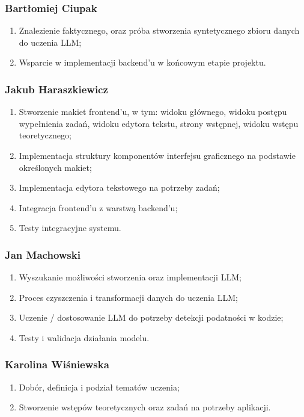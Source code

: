 \documentclass[12pt,a4paper]{article}
\begin{document}
\subsubsection*{Bartłomiej Ciupak}
\begin{enumerate}
    \item Znalezienie faktycznego, oraz próba stworzenia syntetycznego zbioru danych do uczenia LLM;
    \item Wsparcie w implementacji backend'u w końcowym etapie projektu.
\end{enumerate}

\subsubsection*{Jakub Haraszkiewicz}
\begin{enumerate}
    \item Stworzenie makiet frontend'u, w tym: widoku głównego, widoku postępu wypełnienia zadań, widoku edytora tekstu, strony wstępnej, widoku wstępu teoretycznego;
    \item Implementacja struktury komponentów interfejsu graficznego na podstawie określonych makiet;
    \item Implementacja edytora tekstowego na potrzeby zadań;
    \item Integracja frontend'u z warstwą backend'u; 
    \item Testy integracyjne systemu.
\end{enumerate}

\subsubsection*{Jan Machowski}
\begin{enumerate}
    \item Wyszukanie możliwości stworzenia oraz implementacji LLM;
    \item Proces czyszczenia i transformacji danych do uczenia LLM;
    \item Uczenie / dostosowanie LLM do potrzeby detekcji podatności w kodzie;
    \item Testy i walidacja działania modelu.
\end{enumerate}

\subsubsection*{Karolina Wiśniewska}
\begin{enumerate}
    \item Dobór, definicja i podział tematów uczenia;
    \item Stworzenie wstępów teoretycznych oraz zadań na potrzeby aplikacji.
\end{enumerate}
\end{document}

